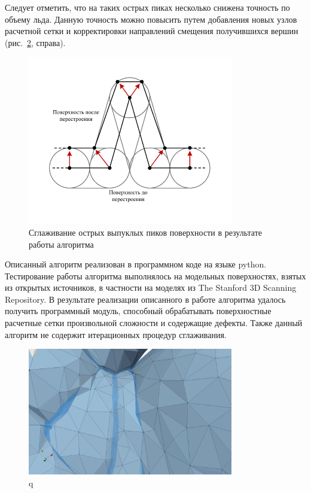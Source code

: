 Следует отметить, что на таких острых пиках несколько снижена точность по объему льда.
Данную точность можно повысить путем добавления новых узлов расчетной сетки и корректировки направлений смещения получившихся вершин (рис.~\ref{fig:text_1_remesh_common_envelope_6}, справа).

\begin{figure}[ht]
	\centering
		\includegraphics[width=0.80\textwidth]{./pics/text_1_remesh_common_envelope/peak2.pdf}
	\caption{Сглаживание острых выпуклых пиков поверхности в результате работы алгоритма}
	\label{fig:text_1_remesh_common_envelope_6}
\end{figure}

Описанный алгоритм реализован в программном коде на языке python.
Тестирование работы алгоритма выполнялось на модельных поверхностях, взятых из открытых источников, в частности на моделях из The Stanford 3D Scanning Repository.
В результате реализации описанного в работе алгоритма удалось получить программный модуль, способный обрабатывать поверхностные расчетные сетки произвольной сложности и содержащие дефекты.
Также данный алгоритм не содержит итерационных процедур сглаживания.

\begin{figure}[ht]
	\centering
	\includegraphics[width=0.80\textwidth]{./pics/text_1_remesh_common_envelope/pic_envelope_cave.png}
	\caption{q}
	\label{fig:text_1_remesh_common_envelope_6}
\end{figure}

